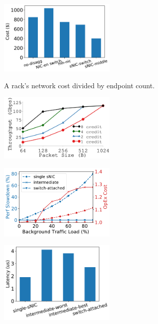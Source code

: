 {
\begin{figure}[th]
\begin{center}
\centerline{\includegraphics[width=0.5\textwidth]{snic/Figures/fig-single-rack-capex-perDevCost.pdf}}
{
A rack's network cost divided by endpoint count. 
}
\end{center}
\end{figure}
}
{
\begin{figure}[h]
\begin{center}
\centerline{\includegraphics[width=0.5\textwidth]{snic/Figures/g_plot_credit.pdf}}
{
}
\end{center}
\end{figure}
}
{
\begin{figure}[h]
\begin{center}
\centerline{\includegraphics[width=0.5\textwidth]{snic/Figures/fig-dist-nic-load-increase.pdf}}
{
}
\end{center}
\end{figure}
}
{
\begin{figure}[h]
\begin{center}
\centerline{\includegraphics[width=0.5\textwidth]{snic/Figures/fig-dist-nic-latency.pdf}}
{
}
\end{center}
\end{figure}
}